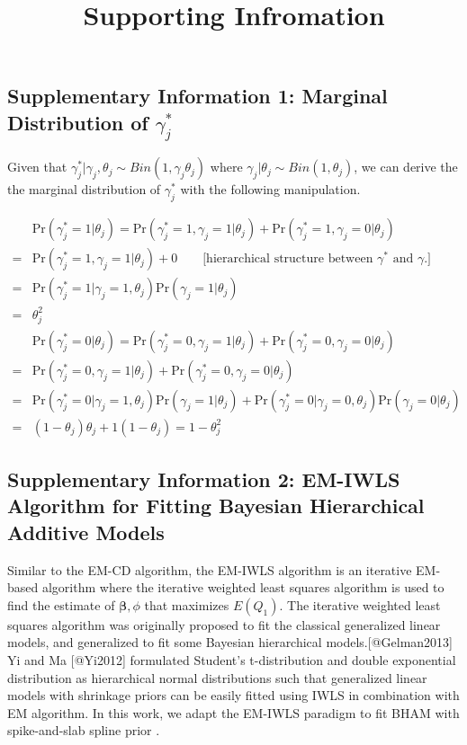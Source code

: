 \documentclass[]{article}
\title{Supporting Infromation}
\author{}
\date{\vspace{-2.5em}}
\begin{document}
\maketitle

\newcommand{\tp}{*}
\newcommand{\pr}{\text{Pr}}
\newcommand{\bs}[1]{\boldsymbol{#1}}

\subsection{Supplementary Information 1: Marginal Distribution of $\gamma_j^\tp$}

Given that
\(\gamma_{j}^\tp | \gamma_{j}, \theta_j \sim Bin(1, \gamma_{j}\theta_j)\)
where \(\gamma_{j} | \theta_j \sim Bin(1, \theta_j)\), we can derive the
the marginal distribution of \(\gamma_{j}^\tp\) with the following
manipulation.

\begin{align*}
& \pr(\gamma_j^\tp = 1 | \theta_j)  = \pr(\gamma_j^\tp = 1, \gamma_j = 1 | \theta_j) + \pr(\gamma_j^\tp = 1 , \gamma_j = 0| \theta_j)\\
= & \pr(\gamma_j^\tp = 1, \gamma_j = 1 | \theta_j) + 0 \qquad \text{[hierarchical structure between }\gamma^\tp \text{ and }\gamma \text{.]}\\
= & \pr(\gamma_j^\tp = 1| \gamma_j = 1,  \theta_j)\pr(\gamma_j = 1| \theta_j)\\
= & \theta_j^2\\
& \pr(\gamma_j^\tp = 0 | \theta_j)  = \pr(\gamma_j^\tp = 0, \gamma_j = 1 | \theta_j) + \pr(\gamma_j^\tp = 0 , \gamma_j = 0| \theta_j)\\
= & \pr(\gamma_j^\tp = 0, \gamma_j = 1 | \theta_j) + \pr(\gamma_j^\tp = 0, \gamma_j = 0 | \theta_j)\\
= & \pr(\gamma_j^\tp = 0| \gamma_j = 1,  \theta_j)\pr(\gamma_j = 1| \theta_j) + \pr(\gamma_j^\tp = 0| \gamma_j = 0,  \theta_j)\pr(\gamma_j = 0| \theta_j)\\
= & (1-\theta_j)\theta_j + 1(1-\theta_j) = 1-\theta_j^2
\end{align*}

\clearpage

\subsection{Supplementary Information 2: EM-IWLS Algorithm for Fitting Bayesian Hierarchical Additive Models}

Similar to the EM-CD algorithm, the EM-IWLS algorithm is an iterative
EM-based algorithm where the iterative weighted least squares algorithm
is used to find the estimate of \(\bs \beta, \phi\) that maximizes
\(E(Q_1)\). The iterative weighted least squares algorithm was
originally proposed to fit the classical generalized linear models, and
generalized to fit some Bayesian hierarchical models.{[}@Gelman2013{]}
Yi and Ma {[}@Yi2012{]} formulated Student's t-distribution and double
exponential distribution as hierarchical normal distributions such that
generalized linear models with shrinkage priors can be easily fitted
using IWLS in combination with EM algorithm. In this work, we adapt the
EM-IWLS paradigm to fit BHAM with spike-and-slab spline prior .
\end{document}
